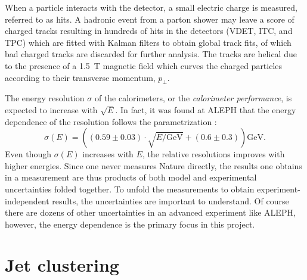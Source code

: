 When a particle interacts with the detector, a small electric charge is measured, referred to as hits. A hadronic event from a parton shower may leave a score of charged tracks resulting in hundreds of hits in the detectors (VDET, ITC, and TPC) which are fitted with Kalman filters \autocite{kalmanNewApproachLinear1960} to obtain global track fits, of which bad charged tracks are discarded for further analysis. The tracks are helical due to the presence of a \SI{1.5}{T} magnetic field which curves the charged particles according to their transverse momentum, $p_\perp$.

The energy resolution $\sigma$ of the calorimeters, or the \emph{calorimeter performance}, is expected to increase with $\sqrt{E}$. In fact, it was found at ALEPH that the energy dependence of the resolution follows the parametrization \autocite{buskulicInvestigationBd0Bs01994}:
\begin{equation}
  \sigma(E) = \left( \left( 0.59 \pm 0.03 \right) \cdot \sqrt{E / \mathrm{GeV}} +  \left(0.6 \pm 0.3 \right) \right) \mathrm{GeV}.
\end{equation}
Even though $\sigma(E)$ increases with $E$, the relative resolutions improves with higher energies. Since one never measures Nature directly, the results one obtains in a measurement are thus products of both model and experimental uncertainties folded together. To unfold the measurements to obtain experiment-independent results, the uncertainties are important to understand. Of course there are dozens of other uncertainties in an advanced experiment like ALEPH, however, the energy dependence is the primary focus in this project. 

\section{Jet clustering}
\label{sec:hep:jet_clustering}

